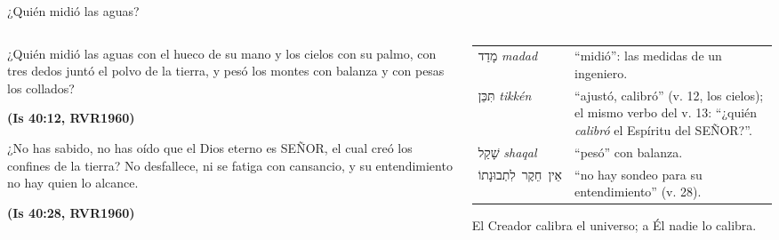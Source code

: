 \documentclass[hyperref={bookmarks=false},aspectratio=169]{beamer}
\newcommand{\heb}[1]{\mbox{\foreignlanguage{hebrew}{#1}}}
\newcommand{\SENOR}{S{\fontsize{0.78em}{1em}\selectfont EÑOR}}
\newcommand{\fuente}[1]{\par\hfill{\upshape\bfseries\footnotesize\textcolor{azul}{#1}}}
\begin{document}
\begin{frame}{¿Quién midió las aguas?}
\begin{columns}[c,onlytextwidth]
\begin{column}{0.52\textwidth}
\begin{cita}¿Quién midió las aguas con el hueco de su mano y los cielos con su palmo, con tres dedos juntó el polvo de la tierra, y pesó los montes con balanza y con pesas los collados?\fuente{(Is 40:12, RVR1960)}\end{cita}
\begin{cita}¿No has sabido, no has oído que el Dios eterno es \SENOR, el cual creó los confines de la tierra? No desfallece, ni se fatiga con cansancio, y su entendimiento no hay quien lo alcance.\fuente{(Is 40:28, RVR1960)}\end{cita}
\end{column}
\begin{column}{0.46\textwidth}
\scriptsize\renewcommand{\arraystretch}{1.15}
\begin{tabular}{@{}>{\RaggedRight\arraybackslash}p{1.8cm}>{\RaggedRight\arraybackslash}p{3.3cm}@{}}
\toprule
\heb{מָדַד} \emph{madad} & ``midió'': las medidas de un ingeniero. \\
\heb{תִּכֵּן} \emph{tikkén} & ``ajustó, calibró'' (v. 12, los cielos); el mismo verbo del v. 13: ``¿quién \emph{calibró} el Espíritu del \SENOR?''. \\
\heb{שָׁקַל} \emph{shaqal} & ``pesó'' con balanza. \\
\heb{אֵין חֵקֶר לִתְבוּנָתוֹ} & ``no hay sondeo para su entendimiento'' (v. 28). \\
\bottomrule
\end{tabular}\par\smallskip
\RaggedRight El Creador calibra el universo; a Él nadie lo calibra.
\end{column}
\end{columns}
\end{frame}
\end{document}
